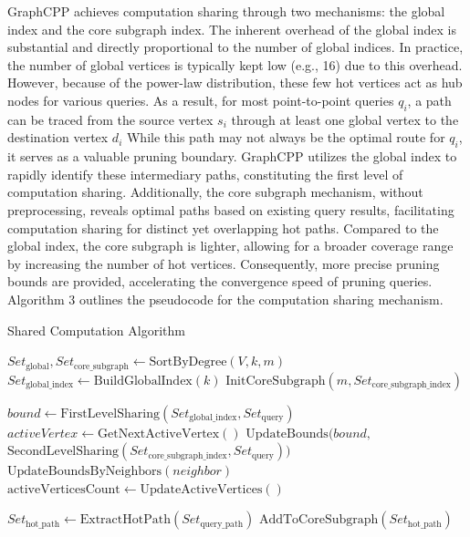 \documentclass[lettersize,journal]{IEEEtran} %
\begin{document}
GraphCPP achieves computation sharing through two mechanisms: the global index and the core subgraph index. The inherent overhead of the global index is substantial and directly proportional to the number of global indices. In practice, the number of global vertices is typically kept low (e.g., 16) due to this overhead. However, because of the power-law distribution, these few hot vertices act as hub nodes for various queries. As a result, for most point-to-point queries $q_i$, a path can be traced from the source vertex $s_i$ through at least one global vertex to the destination vertex $d_i$ While this path may not always be the optimal route for $q_i$, it serves as a valuable pruning boundary. GraphCPP utilizes the global index to rapidly identify these intermediary paths, constituting the first level of computation sharing. Additionally, the core subgraph mechanism, without preprocessing, reveals optimal paths based on existing query results, facilitating computation sharing for distinct yet overlapping hot paths. Compared to the global index, the core subgraph is lighter, allowing for a broader coverage range by increasing the number of hot vertices. Consequently, more precise pruning bounds are provided, accelerating the convergence speed of pruning queries. Algorithm 3 outlines the pseudocode for the computation sharing mechanism.

\begin{algorithm}
  \caption{Shared Computation Algorithm}
  \begin{algorithmic}[1]
  
      \State $Set_{\text{global}}, Set_{\text{core\_subgraph}} \gets \text{SortByDegree}(V, k, m)$
      \State $Set_{\text{global\_index}} \gets \text{BuildGlobalIndex}(k)$
      \State $\text{InitCoreSubgraph}(m, Set_{\text{core\_subgraph\_index}})$
  \EndFunction

      \State $bound \gets \text{FirstLevelSharing}(Set_{\text{global\_index}}, Set_{\text{query}})$
          \State $activeVertex \gets \text{GetNextActiveVertex}()$
              \State $\text{UpdateBounds}(bound, $\\
              $\text{SecondLevelSharing}(Set_{\text{core\_subgraph\_index}}, Set_{\text{query}}))$
          \EndIf
              \State $\text{UpdateBoundsByNeighbors}(neighbor)$
          \EndFor
          \State $\text{activeVerticesCount} \gets \text{UpdateActiveVertices}()$
      \EndWhile
  \EndFunction
  
      \State $Set_{\text{hot\_path}} \gets \text{ExtractHotPath}(Set_{\text{query\_path}})$
      \State $\text{AddToCoreSubgraph}(Set_{\text{hot\_path}})$
  \EndFunction

\end{algorithmic}
\end{algorithm}
\end{document}
